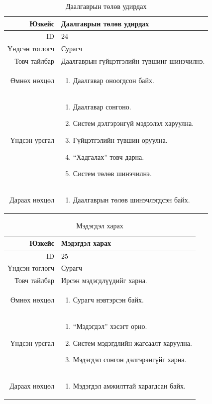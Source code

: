 \begin{longtable}{|r|p{11cm}|}
\caption{Даалгаврын төлөв удирдах}
\label{table:usecase24}\\ \hline
Юзкейс & Даалгаврын төлөв удирдах \\ \hline
ID & 24 \\ \hline
Үндсэн тоглогч & Сурагч \\ \hline
Товч тайлбар & Даалгаврын гүйцэтгэлийн
түвшинг шинэчилнэ. \\ \hline
Өмнөх нөхцөл &
\begin{enumerate}[nosep]
\item Даалгавар оноогдсон байх.
\end{enumerate} \\ \hline
Үндсэн урсгал &
\begin{enumerate}[nosep]
\item Даалгавар сонгоно.
\item Систем дэлгэрэнгүй мэдээлэл харуулна.
\item Гүйцэтгэлийн түвшин оруулна.
\item ``Хадгалах'' товч дарна.
\item Систем төлөв шинэчилнэ.
\end{enumerate} \\ \hline
Дараах нөхцөл &
\begin{enumerate}[nosep]
\item Даалгаврын төлөв шинэчлэгдсэн байх.
\end{enumerate} \\ \hline
\end{longtable}

\begin{longtable}{|r|p{11cm}|}
\caption{Мэдэгдэл харах}
\label{table:usecase25}\\ \hline
Юзкейс & Мэдэгдэл харах \\ \hline
ID & 25 \\ \hline
Үндсэн тоглогч & Сурагч \\ \hline
Товч тайлбар & Ирсэн мэдэгдлүүдийг харна.
\\ \hline
Өмнөх нөхцөл &
\begin{enumerate}[nosep]
\item Сурагч нэвтэрсэн байх.
\end{enumerate} \\ \hline
Үндсэн урсгал &
\begin{enumerate}[nosep]
\item ``Мэдэгдэл'' хэсэгт орно.
\item Систем мэдэгдлийн жагсаалт харуулна.
\item Мэдэгдэл сонгон дэлгэрэнгүйг харна.
\end{enumerate} \\ \hline
Дараах нөхцөл &
\begin{enumerate}[nosep]
\item Мэдэгдэл амжилттай харагдсан байх.
\end{enumerate} \\ \hline
\end{longtable}

